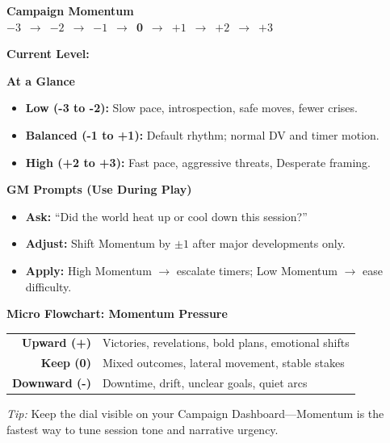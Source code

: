 \documentclass[11pt]{article}
\begin{document}
\begin{tcolorbox}[
  title=\textbf{Momentum Dial (Quick Reference)},
  colback=gray!10,
  colframe=black,
  fonttitle=\bfseries,
  left=6pt,
  right=6pt,
  top=6pt,
  bottom=6pt,
  enhanced,
  sharp corners
,breakable]

\begin{center}
\textbf{Campaign Momentum} \\
\medskip
\Large $-3$ \,$\longrightarrow$\, $-2$ \,$\longrightarrow$\, $-1$ \,$\longrightarrow$\, 
\textbf{0} \,$\longrightarrow$\, $+1$ \,$\longrightarrow$\, $+2$ \,$\longrightarrow$\, $+3$
\end{center}

\medskip

\textbf{Current Level:} \underline{\phantom{XXXX}}

\vspace{6pt}

\textbf{At a Glance}
\begin{itemize}[leftmargin=1.2em]
  \item \textbf{Low (-3 to -2):} Slow pace, introspection, safe moves, fewer crises.
  \item \textbf{Balanced (-1 to +1):} Default rhythm; normal DV and timer motion.
  \item \textbf{High (+2 to +3):} Fast pace, aggressive threats, Desperate framing.
\end{itemize}

\vspace{4pt}

\textbf{GM Prompts (Use During Play)}
\begin{itemize}[leftmargin=1.2em]
  \item \textbf{Ask:} ``Did the world heat up or cool down this session?''
  \item \textbf{Adjust:} Shift Momentum by $\pm 1$ after major developments only.
  \item \textbf{Apply:} High Momentum $\rightarrow$ escalate timers; Low Momentum $\rightarrow$ ease difficulty.
\end{itemize}

\vspace{4pt}

\textbf{Micro Flowchart: Momentum Pressure}

\begin{center}
\begin{longtable}{rl}
\textbf{Upward (+)} & Victories, revelations, bold plans, emotional shifts \\
\textbf{Keep (0)} & Mixed outcomes, lateral movement, stable stakes \\
\textbf{Downward (-)} & Downtime, drift, unclear goals, quiet arcs \\
\end{longtable}
\end{center}

\vspace{2pt}

\textit{Tip:} Keep the dial visible on your Campaign Dashboard---Momentum is the
fastest way to tune session tone and narrative urgency.

\end{tcolorbox}
\end{document}
